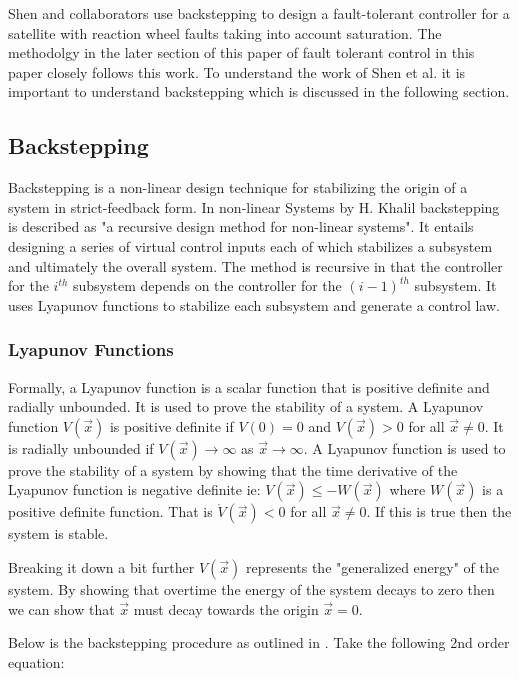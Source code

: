 Shen and collaborators \cite{shenActiveFaulttolerantControl2019} use backstepping to design a fault-tolerant controller for a satellite with reaction wheel faults taking into account saturation. The methodolgy in the later section of this paper of fault tolerant control in this paper closely follows this work. To understand the work of Shen et al. \cite{shenActiveFaulttolerantControl2019} it is important to understand backstepping which is discussed in the following section.

\subsection{Backstepping}
Backstepping is a non-linear design technique for stabilizing the origin of a system in strict-feedback form.
In non-linear Systems by H. Khalil \cite{khalilNonlinearSystems2002} backstepping is described as "a recursive design method for non-linear systems". It entails designing a series of virtual control inputs each of which stabilizes a subsystem and ultimately the overall system. The method is recursive in that the controller for the $i^{th}$ subsystem depends on the controller for the $(i-1)^{th}$ subsystem. It uses Lyapunov functions to stabilize each subsystem and generate a control law. 

\subsubsection{Lyapunov Functions}
Formally, a Lyapunov function is a scalar function that is positive definite and radially unbounded. It is used to prove the stability of a system. A Lyapunov function $V(\vec{x})$ is positive definite if $V(0)=0$ and $V(\vec{x})>0$ for all $\vec{x}\neq0$. It is radially unbounded if $V(\vec{x})\rightarrow\infty$ as $\vec{x}\rightarrow\infty$. A Lyapunov function is used to prove the stability of a system by showing that the time derivative of the Lyapunov function is negative definite ie: $V(\vec{x}) \leq -W(\vec{x})$ where $W(\vec{x})$ is a positive definite function. That is $\dot{V}(\vec{x})<0$ for all $\vec{x}\neq0$. If this is true then the system is stable. 

Breaking it down a bit further $V(\vec{x})$ represents the "generalized energy" of the system. By showing that overtime the energy of the system decays to zero then we can show that $\vec{x}$ must decay towards the origin $\vec{x}=0$.

\par 
Below is the backstepping procedure as outlined in \cite{khalilNonlinearSystems2002}. Take the following 2nd order equation:

